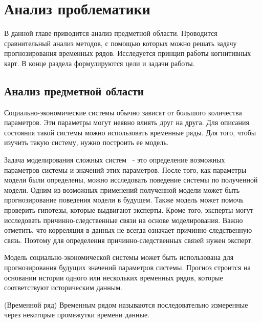 

\chapter{Анализ проблематики }
\label{chapter1}

\begin{annotation}
	В данной главе приводится анализ предметной области.
	Проводится сравнительный анализ методов, с помощью которых
	можно решать задачу прогнозирования временных рядов.
	Исследуется принцип работы когнитивных карт.
	В конце раздела формулируются цели и задачи работы.
\end{annotation}


\section{Анализ предметной области}

Социально-экономические системы обычно зависят от большого количества параметров.
Эти параметры могут неявно влиять друг на друга. Для описания состояния такой системы
можно использовать временные ряды. Для того, чтобы изучить такую систему, нужно построить ее модель.

Задача моделирования сложных систем ~- это определение возможных параметров
системы и значений этих параметров. После того, как параметры модели были определены,
можно исследовать поведение системы по полученной модели. Одним из возможных
применений полученной модели может быть прогнозирование поведения модели в будущем.
Также модель может помочь проверить гипотезы, которые выдвигают эксперты.
Кроме того, эксперты могут исследовать причинно-следственные связи на основе моделирования.
Важно отметить, что корреляция в данных не всегда означает причинно-следственную связь.
Поэтому для определения причинно-следственных связей нужен эксперт.

Модель социально-экономической системы может быть использована
для прогнозирования будущих значений параметров системы. Прогноз строится на основании
истории одного или нескольких временных рядов, которые соответствуют историческим данным.

\begin{definition}
	(Временной ряд)
	Временным рядом называются последовательно измеренные через некоторые промежутки времени данные.
\end{definition}

